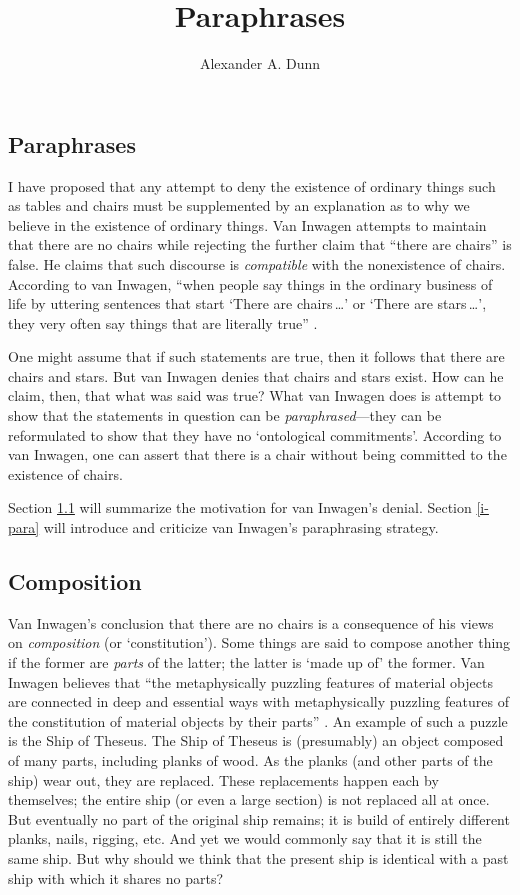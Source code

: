 \documentclass[11pt]{article}
\title{Paraphrases}
\author{Alexander A. Dunn}
\begin{document}
\ifstandalone
\maketitle
\begin{spacing}{1.5}
\fi

\section{Paraphrases}
\label{van-paraphrase}
I have proposed that any attempt to deny the existence of ordinary
things such as tables and chairs must be supplemented by an
explanation as to why we believe in the existence of ordinary things.
Van Inwagen attempts to maintain that there are no chairs while
rejecting the further claim that ``there are chairs'' is false.  He
claims that such discourse is {\em compatible} with the nonexistence
of chairs.  According to van Inwagen, ``when people say things in the
ordinary business of life by uttering sentences that start `There are
chairs\,\ldots ' or `There are stars\,\ldots ', they very often say
things that are literally true'' \citep[102]{inwagen1995}.

One might assume that if such statements are true, then it follows
that there are chairs and stars.  But van Inwagen denies that chairs
and stars exist.  How can he claim, then, that what was said was true?
What van Inwagen does is attempt to show that the statements in
question can be {\em paraphrased}---they can be reformulated to show
that they have no `ontological commitments'.  According to van
Inwagen, one can assert that there is a chair without being committed
to the existence of chairs.

Section \ref{comp} will summarize the motivation for van Inwagen's
denial.  Section \ref{i-para} will introduce and criticize van
Inwagen's paraphrasing strategy.

\subsection{Composition}
\label{comp}
Van Inwagen's conclusion that there are no chairs is a consequence of
his views on {\em composition} (or `constitution').  Some things are
said to compose another thing if the former are {\em parts} of the
latter; the latter is `made up of' the former.  Van Inwagen believes
that ``the metaphysically puzzling features of material objects are
connected in deep and essential ways with metaphysically puzzling
features of the constitution of material objects by their
parts'' \citep[18]{inwagen1995}.  An example of such a puzzle is the
Ship of Theseus.  The Ship of Theseus is (presumably) an object
composed of many parts, including planks of wood.  As the planks (and
other parts of the ship) wear out, they are replaced.  These
replacements happen each by themselves; the entire ship (or even a
large section) is not replaced all at once.  But eventually no part of
the original ship remains; it is build of entirely different planks,
nails, rigging, etc.  And yet we would commonly say that it is still
the same ship.  But why should we think that the present ship is
identical with a past ship with which it shares no parts?


\end{spacing}
\end{document}
